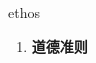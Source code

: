 
\begin{frame}
{\huge ethos}
\begin{center}
\begin{enumerate}\Large
  \item \textbf{道德准则}
\end{enumerate}
\end{center}
\end{frame}
